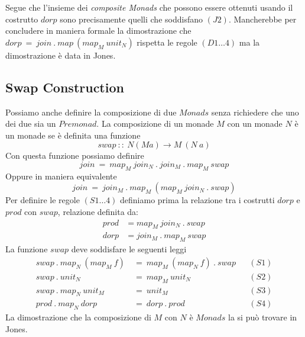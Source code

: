 Segue che l'insieme dei \textit{composite Monads} che possono essere ottenuti
usando il costrutto $dorp$ sono precisamente quelli che soddisfano $(J2)$.
Mancherebbe per concludere in maniera formale la dimostrazione che $dorp\
=\ join\ .\ map\ (map_M\ unit_N)$ rispetta le regole $(D1\dots4)$ ma la
dimostrazione è data in Jones\cite{jones0}.

\subsection{Swap Construction}
\label{swap_construction}

Possiamo anche definire la composizione di due $Monads$ senza richiedere che uno
dei due sia un $Premonad$.
La composizione di un monade $M$ con un monade $N$ è un monade se è definita
una funzione
\begin{equation*}
  swap\ ::\ N  (M  a) \to M\ (N\ a)
\end{equation*}
Con questa funzione possiamo definire
\begin{equation*}
  join\ =\ map_M\ join_N\ .\ join_M\ .\ map_M\ swap
\end{equation*}
Oppure in maniera equivalente
\begin{equation*}
  join\ =\ join_M\ .\ map_M\ (map_M\ join_N\ .\ swap)
\end{equation*}
Per definire le regole $(S1\dots4)$ definiamo prima la relazione tra i
costrutti $dorp$ e $prod$ con $swap$, relazione definita da:
\begin{align*}
  prod &= map_M\ join_N\ .\ swap\\
  dorp &= join_M\ .\ map_M\ swap
\end{align*}
La funzione $swap$ deve soddisfare le seguenti leggi
\begin{align*}
  swap\ .\ map_N\ (map_M\ f)\ &=\ map_M\ (map_N\ f)\ .\ swap &&(S1)\\
  swap\ .\ unit_N\ &=\ map_M\ unit_N && (S2)\\
  swap\ .\ map_N\ unit_M\ &=\ unit_M && (S3)\\
  prod\ .\ map_N\ dorp\ &=\ dorp\ .\ prod &&(S4)
\end{align*}
La dimostrazione che la composizione di $M$ con $N$ è $Monads$ la si può
trovare in Jones\cite{jones0}.\newline

